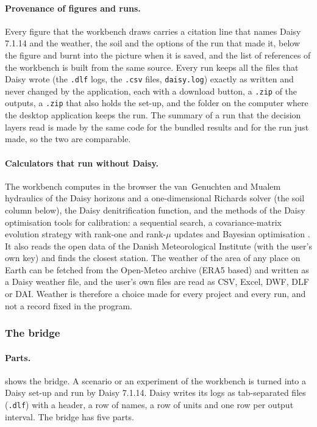 \documentclass[preprint,12pt]{elsarticle}
\begin{document}
\paragraph{Provenance of figures and runs.}
Every figure that the workbench draws carries a citation line that names Daisy 7.1.14 \cite{Hansen2012,Holbak2026} and the weather, the soil and the options of the run that made it, below the figure and burnt into the picture when it is saved, and the list of references of the workbench is built from the same source. Every run keeps all the files that Daisy wrote (the \texttt{.dlf} logs, the \texttt{.csv} files, \texttt{daisy.log}) exactly as written and never changed by the application, each with a download button, a \texttt{.zip} of the outputs, a \texttt{.zip} that also holds the set-up, and the folder on the computer where the desktop application keeps the run. The summary of a run that the decision layers read is made by the same code for the bundled results and for the run just made, so the two are comparable.

\paragraph{Calculators that run without Daisy.}
The workbench computes in the browser the van~Genuchten and Mualem hydraulics of the Daisy horizons and a one-dimensional Richards solver (the soil column below), the Daisy denitrification function, and the methods of the Daisy optimisation tools for calibration: a sequential search, a covariance-matrix evolution strategy with rank-one and rank-$\mu$ updates \cite{HansenOstermeier2001} and Bayesian optimisation \cite{Mockus1978}. It also reads the open data of the Danish Meteorological Institute (with the user's own key) and finds the closest station. The weather of the area of any place on Earth can be fetched from the Open-Meteo archive (ERA5 based) and written as a Daisy weather file, and the user's own files are read as CSV, Excel, DWF, DLF or DAI. Weather is therefore a choice made for every project and every run, and not a record fixed in the program.


\subsubsection{The bridge}
\paragraph{Parts.}
 shows the bridge. A scenario or an experiment of the workbench is turned into a Daisy set-up and run by Daisy 7.1.14. Daisy writes its logs as tab-separated files (\texttt{.dlf}) with a header, a row of names, a row of units and one row per output interval. The bridge has five parts.
\end{document}
